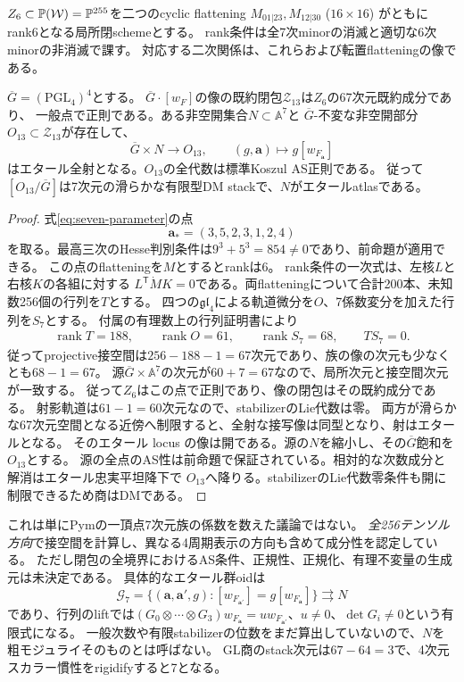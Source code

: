 $Z_6\subset\mathbb P(\mathcal W)=\mathbb P^{255}$を二つのcyclic flattening
$M_{01|23},M_{12|30}$ ($16\times16$) がともにrank6となる局所閉schemeとする。
rank条件は全7次minorの消滅と適切な6次minorの非消滅で課す。
対応する二次関係は、これらおよび転置flatteningの像である。

\begin{theorem}[四頂点成分の一般開部分]\label{thm:r13-open}
$\overline G=(\mathrm{PGL}_4)^4$とする。
$\overline G\cdot[w_F]$の像の既約閉包$\mathcal Z_{13}$は$Z_6$の67次元既約成分であり、
一般点で正則である。ある非空開集合$N\subset\mathbb A^7$と
$\overline G$-不変な非空開部分$O_{13}\subset\mathcal Z_{13}$が存在して、
\[
 \overline G\times N\longrightarrow O_{13},\qquad(g,\boldsymbol a)\longmapsto g[w_{F_{\boldsymbol a}}]
\]
はエタール全射となる。$O_{13}$の全代数は標準Koszul AS正則である。
従って$[O_{13}/\overline G]$は7次元の滑らかな有限型DM stackで、$N$がエタールatlasである。
\end{theorem}
\begin{proof}
式\eqref{eq:seven-parameter}の点
\[
 \boldsymbol a_*=(3,5,2,3,1,2,4)
\]
を取る。最高三次のHesse判別条件は$9^3+5^3=854\ne0$であり、前命題が適用できる。
この点のflatteningを$M$とするとrankは6。
rank条件の一次式は、左核$L$と右核$K$の各組に対する
$L^{\mathsf T}\dot M K=0$である。両flatteningについて合計200本、未知数256個の行列を$T$とする。
四つの$\mathfrak{gl}_4$による軌道微分を$O$、7係数変分を加えた行列を$S_7$とする。
付属の有理数上の行列証明書により
\begin{gather*}
 \operatorname{rank}T=188,\qquad
 \operatorname{rank}O=61,\qquad
 \operatorname{rank}S_7=68,\qquad TS_7=0.
\end{gather*}
従ってprojective接空間は$256-188-1=67$次元であり、族の像の次元も少なくとも$68-1=67$。
源$\overline G\times\mathbb A^7$の次元が$60+7=67$なので、局所次元と接空間次元が一致する。
従って$Z_6$はこの点で正則であり、像の閉包はその既約成分である。
射影軌道は$61-1=60$次元なので、stabilizerのLie代数は零。
両方が滑らかな67次元空間となる近傍へ制限すると、全射な接写像は同型となり、射はエタールとなる。
そのエタール locus の像は開である。源の$N$を縮小し、その$\overline G$飽和を$O_{13}$とする。
源の全点のAS性は前命題で保証されている。相対的な次数成分と解消はエタール忠実平坦降下で
$O_{13}$へ降りる。stabilizerのLie代数零条件も開に制限できるため商はDMである。
\end{proof}

これは単にPymの一頂点7次元族の係数を数えた議論ではない。
\emph{全256テンソル方向}で接空間を計算し、異なる4周期表示の方向も含めて成分性を認定している。
ただし閉包の全境界におけるAS条件、正規性、正規化、有理不変量の生成元は未決定である。
具体的なエタール群oidは
\[
 \mathcal G_7=\{(\boldsymbol a,\boldsymbol a',g):
        [w_{F_{\boldsymbol a'}}]=g[w_{F_{\boldsymbol a}}]\}
       \rightrightarrows N
\]
であり、行列のliftでは$(G_0\otimes\cdots\otimes G_3)w_{F_{\boldsymbol a}}
=u w_{F_{\boldsymbol a'}}$、$u\ne0$、$\det G_i\ne0$という有限式になる。
一般次数や有限stabilizerの位数をまだ算出していないので、$N$を粗モジュライそのものとは呼ばない。
GL商のstack次元は$67-64=3$で、4次元スカラー慣性をrigidifyすると7となる。


